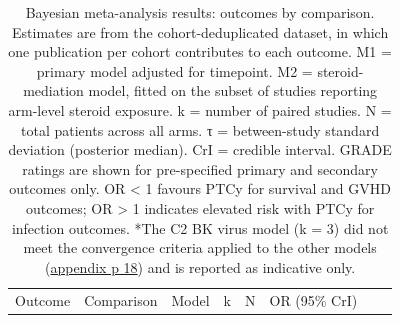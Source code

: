 \documentclass[
  british,
  8.6pt,
  a4paper,
  twocolumn]{article}
\begin{document}
\begin{longtable}[]{@{}
  >{\raggedright\arraybackslash}p{}
  >{\raggedright\arraybackslash}p{}
  >{\raggedright\arraybackslash}p{}
  >{\raggedleft\arraybackslash}p{}
  >{\raggedleft\arraybackslash}p{}
  >{\raggedright\arraybackslash}p{}
  >{\raggedleft\arraybackslash}p{}
  >{\raggedright\arraybackslash}p{}@{}}
\caption{Bayesian meta-analysis results: outcomes by comparison.
Estimates are from the cohort-deduplicated dataset, in which one
publication per cohort contributes to each outcome. M1 = primary model
adjusted for timepoint. M2 = steroid-mediation model, fitted on the
subset of studies reporting arm-level steroid exposure. k = number of
paired studies. N = total patients across all arms. τ = between-study
standard deviation (posterior median). CrI = credible interval. GRADE
ratings are shown for pre-specified primary and secondary outcomes only.
OR \textless{} 1 favours PTCy for survival and GVHD outcomes; OR
\textgreater{} 1 indicates elevated risk with PTCy for infection
outcomes. *The C2 BK virus model (k = 3) did not meet the convergence
criteria applied to the other models
(\href{appendix-preview.html\#s7.-mcmc-diagnostics}{appendix p 18}) and
is reported as indicative only. }\label{tbl-results}\tabularnewline
\toprule\noalign{}
\begin{minipage}[b]{\linewidth}\raggedright
Outcome
\end{minipage} & \begin{minipage}[b]{\linewidth}\raggedright
Comparison
\end{minipage} & \begin{minipage}[b]{\linewidth}\raggedright
Model
\end{minipage} & \begin{minipage}[b]{\linewidth}\raggedleft
k
\end{minipage} & \begin{minipage}[b]{\linewidth}\raggedleft
N
\end{minipage} & \begin{minipage}[b]{\linewidth}\raggedright
OR (95\% CrI)
\end{minipage} & \begin{minipage}[b]{\linewidth}\raggedleft

\end{minipage}
\end{longtable}
\end{document}
